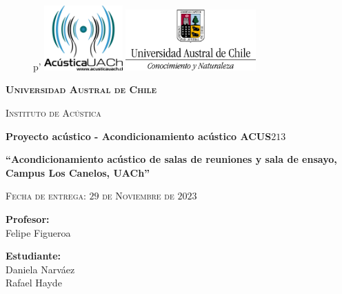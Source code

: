 \thispagestyle{empty}
			\begin{figure}[ht]
		   \minipage{\textwidth}p'
				\includegraphics[width=3cm]{Imagenes/acustica-color.png}
				\label{escudoTecNM}
		   \endminipage
		   \minipage{\textwidth}
				\includegraphics[width=5cm]{Imagenes/UACh_Marcacolor.png}
				\label{EscudoITCJ}
			\endminipage
		\end{figure}
		
		\vspace{0.1cm}
		
		\begin{center}
		    {\scshape\LARGE \textbf{Universidad Austral de Chile} \par}
			{\scshape\Large Instituto de Acústica \par}
            \vspace{0.3cm}
             {\Large \textbf{Proyecto acústico - Acondicionamiento acústico ACUS$213$}}

			\begin{center}
				
			{\LARGE\bfseries ``Acondicionamiento acústico de salas de reuniones y sala de ensayo, Campus Los Canelos, UACh'' \par}
            \vspace{0.75cm}
            
		{\scshape\Large Fecha de entrega: $29$ de Noviembre de $2023$\par}	
        \vspace{0.75cm}
	    \LARGE	{ \textbf{Profesor:}}\\
        \large		{Felipe Figueroa}\\
        
		\vspace{0.5cm}	
		
		\LARGE	{ \textbf{Estudiante:}}\\
        \large	 {Daniela Narváez}\\
        \large   {Rafael Hayde}
    
        
        
        \normalsize	 {}

				\vspace{1.25cm}
				\vspace{0.9cm}
				
			\end{center}
	
		\end{center}